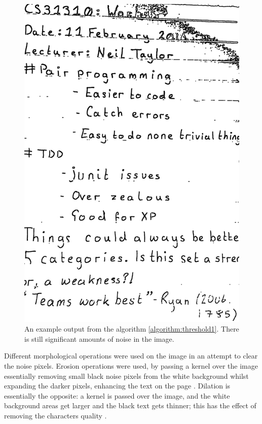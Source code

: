 \begin{figure}[H]
  \centering
  \includegraphics[scale=0.5]{images/removed_lines_still_noise}
  \caption{An example output from the algorithm \ref{algorithm:threshold1}. There is still significant amounts of noise in the image.}
  \label{fig:remove_lines_noise}
\end{figure}

Different morphological operations were used on the image in an attempt to clear the noise pixels. Erosion operations were used, by passing a kernel over the image essentially removing small black noise pixels from the white background whilst expanding the darker pixels, enhancing the text on the page \cite{citeulike:14024957}. Dilation is essentially the opposite: a kernel is passed over the image, and the white background areas get larger and the black text gets thinner; this has the effect of removing the characters quality \cite{citeulike:14024957}.


